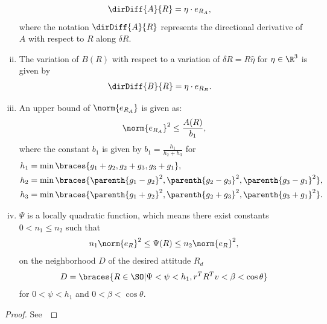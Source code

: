 \begin{prop}
\begin{enumerate}[(i)]
	\begin{align}\label{eq:dirDiff_A}
		\dirDiff{A}{R} &= \eta \cdot e_{R_A} ,
	\end{align}
	where the notation \( \dirDiff{A}{R} \) represents the directional derivative of $A$ with respect to $R$ along $\delta R$.
	\item \label{item:prop_erb} The variation of \( B(R) \) with respect to a variation of \( \delta R = R \hat{\eta} \) for \( \eta \in \R^3 \) is given by
	\begin{align}\label{eq:dirDiff_B}
		\dirDiff{B}{R} &= \eta \cdot e_{R_{B}}.
	\end{align}
	\item \label{item:prop_era_upbound}An upper bound of \( \norm{e_{R_A}} \) is given as:
	\begin{align}
		\norm{e_{R_A}}^2 \leq \frac{A(R)}{b_1} , \label{eqn:psi_lower_bound}
	\end{align}
	where the constant \( b_1 \) is given by \( b_1 = \frac{h_1}{h_2 + h_3} \) for 
	\begin{align*}
		h_1 &= \min\braces{g_1 + g_2, g_2 + g_3 , g_3 + g_1} ,\\
		h_2 &= \min\braces{\parenth{g_1 -g_2}^2,\parenth{g_2 -g_3}^2 , \parenth{g_3 -g_1}^2} ,\\
		h_3 &= \min\braces{\parenth{g_1 + g_2}^2, \parenth{g_2 + g_3}^2 , \parenth{g_3 + g_1}^2}.		
	\end{align*}
    \item \label{item:prop_psi_quadratic} \( \Psi \) is a locally quadratic function, which means there exist constants \( 0 < n_1 \leq n_2 \) such that
    \begin{align}\label{eq:psi_bound}
        n_1 \norm{e_R}^2 \leq \Psi(R) \leq n_2 \norm{e_R}^2 ,
    \end{align}
    on the neighborhood $D$ of the desired attitude \( R_d \)
    \begin{align}\label{eq:psi_quadratic_domain}
        D = \braces{R\in\SO  \vert \Psi < \psi < h_1, r^T R^T v < \beta < \cos \theta}
    \end{align}
    for $0<\psi < h_1 $ and $0< \beta<\cos\theta$. 
\end{enumerate}
\end{prop}
\begin{proof}
See~
\end{proof}

